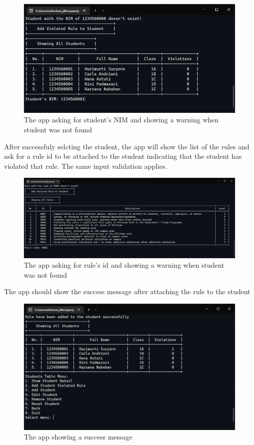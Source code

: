 \documentclass[12pt,titlepage]{article}
\begin{document}
\begin{figure}[h]
    \centering
    \includegraphics[width=.8\textwidth]{images/add-student-rule-input.png}
    \caption{The app asking for student's NIM and showing a warning when student was not found}
\end{figure}

After successfuly selcting the student, the app will show the list of the rules and ask for a rule id to be attached to the student
indicating that the student has violated that rule. The same input validation applies.

\begin{figure}[h]
    \centering
    \includegraphics[width=.8\textwidth]{images/add-student-rule-input-2.png}
    \caption{The app asking for rule's id and showing a warning when student was not found}
\end{figure}

\pagebreak

The app should show the success message after attaching the rule to the student

\begin{figure}[h]
    \centering
    \includegraphics[width=.8\textwidth]{images/add-student-rule-success.png}
    \caption{The app showing a success message}
\end{figure}
\end{document}
